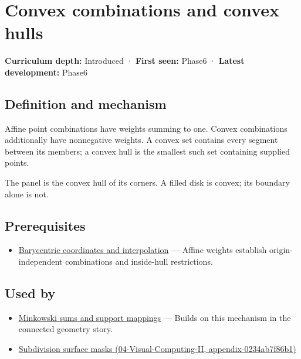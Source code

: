 \hypertarget{appendix-0026ec42c9d5}{}
\section{Convex combinations and convex hulls}\label{appendix-0026ec42c9d5-convex-combinations-and-convex-hulls}

\textbf{Curriculum depth:} Introduced · \textbf{First seen:} Phase6 · \textbf{Latest development:} Phase6

\subsection{Definition and mechanism}\label{appendix-0026ec42c9d5-definition-and-mechanism}

Affine point combinations have weights summing to one. Convex combinations additionally have nonnegative weights. A convex set contains every segment between its members; a convex hull is the smallest such set containing supplied points.

The panel is the convex hull of its corners. A filled disk is convex; its boundary alone is not.

\subsection{Prerequisites}\label{appendix-0026ec42c9d5-prerequisites}

\begin{itemize}
\tightlist
\item
  \hyperref[appendix-02b9d9a81dca]{Barycentric coordinates and interpolation} --- Affine weights establish origin-independent combinations and inside-hull restrictions.
\end{itemize}

\subsection{Used by}\label{appendix-0026ec42c9d5-used-by}

\begin{itemize}
\tightlist
\item
  \hyperref[appendix-215ac7099a82]{Minkowski sums and support mappings} --- Builds on this mechanism in the connected geometry story.
\item
  \href{../04-Visual-Computing-II/main.pdf\#nameddest=appendix-0234ab7f86b1}{Subdivision surface masks (04-Visual-Computing-II, appendix-0234ab7f86b1)}
\end{itemize}

